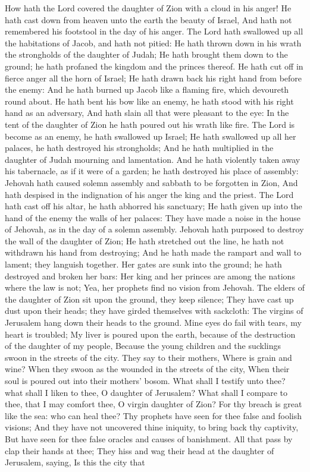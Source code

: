 How hath the Lord covered the daughter of Zion with a cloud in his anger! He hath cast down from heaven unto the earth the beauty of Israel, And hath not remembered his footstool in the day of his anger.  The Lord hath swallowed up all the habitations of Jacob, and hath not pitied: He hath thrown down in his wrath the strongholds of the daughter of Judah; He hath brought them down to the ground; he hath profaned the kingdom and the princes thereof.  He hath cut off in fierce anger all the horn of Israel; He hath drawn back his right hand from before the enemy: And he hath burned up Jacob like a flaming fire, which devoureth round about.  He hath bent his bow like an enemy, he hath stood with his right hand as an adversary, And hath slain all that were pleasant to the eye: In the tent of the daughter of Zion he hath poured out his wrath like fire.  The Lord is become as an enemy, he hath swallowed up Israel; He hath swallowed up all her palaces, he hath destroyed his strongholds; And he hath multiplied in the daughter of Judah mourning and lamentation.  And he hath violently taken away his tabernacle, as if it were of a garden; he hath destroyed his place of assembly: Jehovah hath caused solemn assembly and sabbath to be forgotten in Zion, And hath despised in the indignation of his anger the king and the priest.  The Lord hath cast off his altar, he hath abhorred his sanctuary; He hath given up into the hand of the enemy the walls of her palaces: They have made a noise in the house of Jehovah, as in the day of a solemn assembly.  Jehovah hath purposed to destroy the wall of the daughter of Zion; He hath stretched out the line, he hath not withdrawn his hand from destroying; And he hath made the rampart and wall to lament; they languish together.  Her gates are sunk into the ground; he hath destroyed and broken her bars: Her king and her princes are among the nations where the law is not; Yea, her prophets find no vision from Jehovah.  The elders of the daughter of Zion sit upon the ground, they keep silence; They have cast up dust upon their heads; they have girded themselves with sackcloth: The virgins of Jerusalem hang down their heads to the ground.  Mine eyes do fail with tears, my heart is troubled; My liver is poured upon the earth, because of the destruction of the daughter of my people, Because the young children and the sucklings swoon in the streets of the city.  They say to their mothers, Where is grain and wine? When they swoon as the wounded in the streets of the city, When their soul is poured out into their mothers’ bosom.  What shall I testify unto thee? what shall I liken to thee, O daughter of Jerusalem? What shall I compare to thee, that I may comfort thee, O virgin daughter of Zion? For thy breach is great like the sea: who can heal thee?  Thy prophets have seen for thee false and foolish visions; And they have not uncovered thine iniquity, to bring back thy captivity, But have seen for thee false oracles and causes of banishment.  All that pass by clap their hands at thee; They hiss and wag their head at the daughter of Jerusalem, saying, Is this the city that 